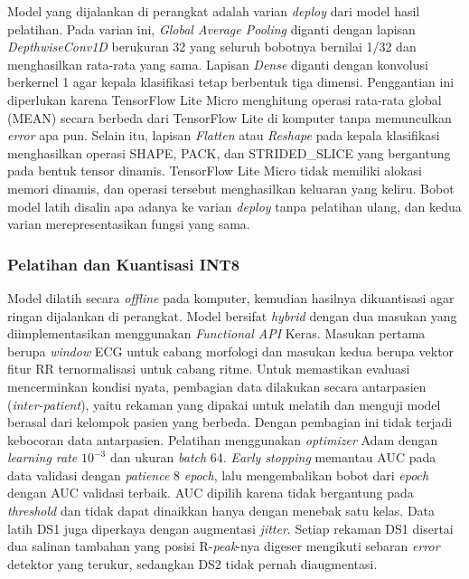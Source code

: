 Model yang dijalankan di perangkat adalah varian \textit{deploy} dari model
hasil pelatihan. Pada varian ini, \textit{Global Average Pooling} diganti dengan
lapisan \textit{DepthwiseConv1D} berukuran 32 yang seluruh bobotnya bernilai
1/32 dan menghasilkan rata-rata yang sama. Lapisan \textit{Dense}
diganti dengan konvolusi berkernel 1 agar kepala klasifikasi tetap berbentuk
tiga dimensi. Penggantian ini diperlukan karena TensorFlow Lite Micro menghitung
operasi rata-rata global (MEAN) secara berbeda dari TensorFlow Lite di komputer tanpa
memunculkan \textit{error} apa pun. Selain itu, lapisan \textit{Flatten} atau \textit{Reshape}
pada kepala klasifikasi menghasilkan operasi SHAPE, PACK, dan STRIDED\_SLICE yang
bergantung pada bentuk tensor dinamis. TensorFlow Lite Micro tidak memiliki
alokasi memori dinamis, dan operasi tersebut menghasilkan keluaran yang keliru. Bobot model latih disalin apa adanya ke varian
\textit{deploy} tanpa pelatihan ulang, dan kedua varian merepresentasikan
fungsi yang sama.

\subsubsection{Pelatihan dan Kuantisasi INT8}

Model dilatih secara \textit{offline} pada komputer, kemudian hasilnya dikuantisasi agar ringan dijalankan di perangkat. Model bersifat \textit{hybrid} dengan dua masukan yang diimplementasikan menggunakan \textit{Functional API} Keras. Masukan pertama berupa \textit{window} ECG untuk cabang morfologi dan masukan kedua berupa vektor fitur RR ternormalisasi untuk cabang ritme. Untuk memastikan evaluasi mencerminkan kondisi nyata, pembagian data dilakukan secara antarpasien (\textit{inter-patient}), yaitu rekaman yang dipakai untuk melatih dan menguji model berasal dari kelompok pasien yang berbeda. Dengan pembagian ini tidak terjadi kebocoran data antarpasien. Pelatihan menggunakan \textit{optimizer} Adam dengan \textit{learning rate} $10^{-3}$ dan ukuran \textit{batch} 64. \textit{Early stopping} memantau AUC pada data validasi dengan \textit{patience} 8 \textit{epoch}, lalu mengembalikan bobot dari \textit{epoch} dengan AUC validasi terbaik. AUC dipilih karena tidak bergantung pada \textit{threshold} dan tidak dapat dinaikkan hanya dengan menebak satu kelas. Data latih DS1 juga diperkaya dengan augmentasi \textit{jitter}. Setiap rekaman DS1 disertai dua salinan tambahan yang posisi R-\textit{peak}-nya digeser mengikuti sebaran \textit{error} detektor yang terukur, sedangkan DS2 tidak pernah diaugmentasi.


